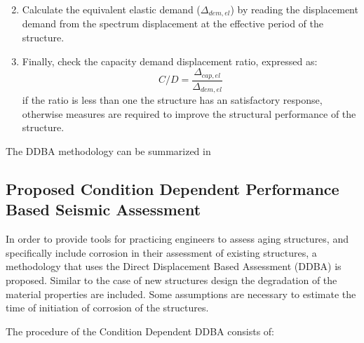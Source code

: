 \begin{enumerate}
\begin{equation}
    \end{equation}
    \item Calculate the equivalent elastic demand ($\Delta_{dem,el}$) by reading the displacement demand from the spectrum displacement at the effective period of the structure. 
    \item Finally, check the capacity demand displacement ratio, expressed as: 
    \begin{equation}
        C/D= \frac{\Delta_{cap,el}}{\Delta_{dem,el}}
    \end{equation}
    if the ratio is less than one the structure has an satisfactory response, otherwise measures are required to improve the structural performance of the structure.
\end{enumerate}

The DDBA methodology can be summarized in 

\subsection{Proposed Condition Dependent Performance Based Seismic Assessment}

In order to provide tools for practicing engineers to assess aging structures, and specifically include corrosion in their assessment of existing structures, a methodology that uses the Direct Displacement Based Assessment (DDBA) is proposed. Similar to the case of new structures design the degradation of the material properties are included. Some assumptions are necessary to estimate the time of initiation of corrosion of the structures.

The procedure of the Condition Dependent DDBA consists of:


